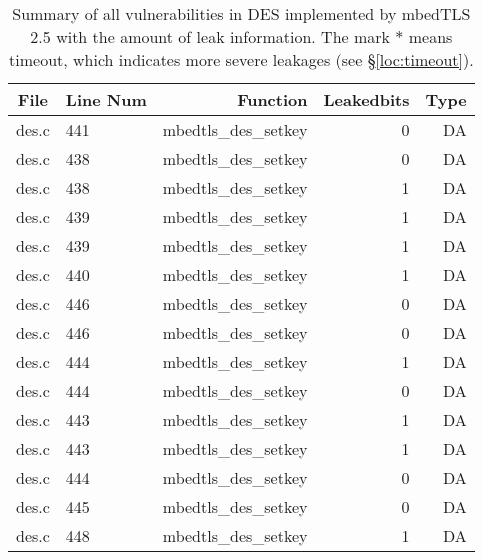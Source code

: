 \begin{table}%
\centering\tiny
\caption{Summary of all vulnerabilities in DES implemented by mbedTLS 2.5 with the amount of leak information. The mark $*$ means timeout, which indicates more severe leakages (see \S\ref{loc:timeout}).}\label{tab:DESmbedTLS}
\begin{tabular}{clrrr}
\hline
\textbf{File} & \textbf{Line Num} & \textbf{Function} & \textbf{Leakedbits} & \textbf{Type} \\\hline
des.c& 441&mbedtls\_des\_setkey&0 &DA\\
des.c& 438&mbedtls\_des\_setkey&0 &DA\\
des.c& 438&mbedtls\_des\_setkey&1 &DA\\
des.c& 439&mbedtls\_des\_setkey&1 &DA\\
des.c& 439&mbedtls\_des\_setkey&1 &DA\\
des.c& 440&mbedtls\_des\_setkey&1 &DA\\
des.c& 446&mbedtls\_des\_setkey&0 &DA\\
des.c& 446&mbedtls\_des\_setkey&0 &DA\\
des.c& 444&mbedtls\_des\_setkey&1 &DA\\
des.c& 444&mbedtls\_des\_setkey&0 &DA\\
des.c& 443&mbedtls\_des\_setkey&1 &DA\\
des.c& 443&mbedtls\_des\_setkey&1 &DA\\
des.c& 444&mbedtls\_des\_setkey&0 &DA\\
des.c& 445&mbedtls\_des\_setkey&0 &DA\\
des.c& 448&mbedtls\_des\_setkey&1 &DA\\
\hline
\end{tabular}
\end{table}